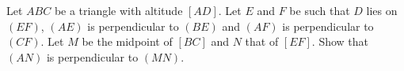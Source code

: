 Let $ABC$ be a triangle with altitude $[AD]$. Let $E$ and $F$ be such that $D$ lies on $(EF)$, $(AE)$ is perpendicular to $(BE)$ and $(AF)$ is perpendicular to $(CF)$. Let $M$ be the midpoint of $[BC]$ and $N$ that of $[EF]$. Show that $(AN)$ is perpendicular to $(MN)$.
